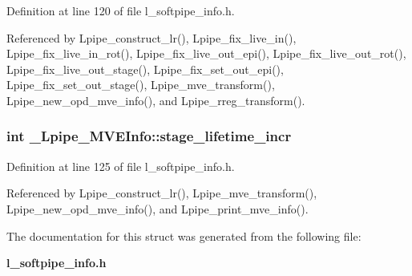 Definition at line 120 of file l\_\-softpipe\_\-info.h.

Referenced by Lpipe\_\-construct\_\-lr(), Lpipe\_\-fix\_\-live\_\-in(), Lpipe\_\-fix\_\-live\_\-in\_\-rot(), Lpipe\_\-fix\_\-live\_\-out\_\-epi(), Lpipe\_\-fix\_\-live\_\-out\_\-rot(), Lpipe\_\-fix\_\-live\_\-out\_\-stage(), Lpipe\_\-fix\_\-set\_\-out\_\-epi(), Lpipe\_\-fix\_\-set\_\-out\_\-stage(), Lpipe\_\-mve\_\-transform(), Lpipe\_\-new\_\-opd\_\-mve\_\-info(), and Lpipe\_\-rreg\_\-transform().
\subsubsection{\setlength{\rightskip}{0pt plus 5cm}int \bf{\_\-Lpipe\_\-MVEInfo::stage\_\-lifetime\_\-incr}}\label{struct__Lpipe__MVEInfo_ab600da820f182e8e72b661971cc68f9}




Definition at line 125 of file l\_\-softpipe\_\-info.h.

Referenced by Lpipe\_\-construct\_\-lr(), Lpipe\_\-mve\_\-transform(), Lpipe\_\-new\_\-opd\_\-mve\_\-info(), and Lpipe\_\-print\_\-mve\_\-info().

The documentation for this struct was generated from the following file:\begin{CompactItemize}
\item 
\bf{l\_\-softpipe\_\-info.h}\end{CompactItemize}

